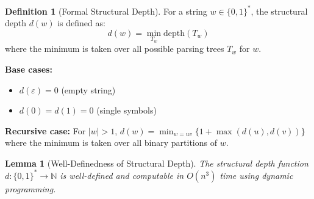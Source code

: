 \documentclass[11pt]{article}
\newtheorem{lemma}[theorem]{Lemma}
\theoremstyle{definition}
\newtheorem{definition}[theorem]{Definition}
\begin{document}
\begin{definition}[Formal Structural Depth]
For a string $w \in \{0,1\}^*$, the structural depth $d(w)$ is defined as:
$$d(w) = \min_{T_w} \text{depth}(T_w)$$
where the minimum is taken over all possible parsing trees $T_w$ for $w$.

\textbf{Base cases:}
\begin{itemize}
\item $d(\varepsilon) = 0$ (empty string)
\item $d(0) = d(1) = 0$ (single symbols)
\end{itemize}

\textbf{Recursive case:}
For $|w| > 1$, $d(w) = \min_{w=uv} \{1 + \max(d(u), d(v))\}$ where the minimum is taken over all binary partitions of $w$.
\end{definition}

\begin{lemma}[Well-Definedness of Structural Depth]
The structural depth function $d: \{0,1\}^* \to \mathbb{N}$ is well-defined and computable in $O(n^3)$ time using dynamic programming.
\end{lemma}
\end{document}
